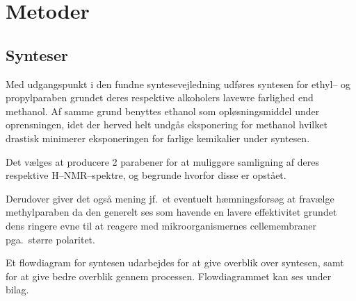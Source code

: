 \section{Metoder}
    \subsection{Synteser} 
    Med udgangspunkt i den fundne syntesevejledning \parencite{Ole2019} udføres syntesen for ethyl-- og propylparaben grundet deres respektive alkoholers lavewre farlighed end methanol. Af samme grund benyttes ethanol som opløsningsmiddel under oprensningen, idet der herved helt undgås eksponering for methanol hvilket drastisk minimerer eksponeringen for farlige kemikalier under syntesen.

    Det vælges at producere 2 parabener for at muliggøre samligning af deres respektive H--NMR--spektre, og begrunde hvorfor disse er opstået. 

    Derudover giver det også mening jf.\ et eventuelt hæmningsforsøg at fravælge methylparaben da den generelt ses som havende en lavere effektivitet grundet dens ringere evne til at reagere med mikroorganismernes cellemembraner pga.\ større polaritet.

    Et flowdiagram for syntesen udarbejdes for at give overblik over syntesen, samt for at give bedre overblik gennem processen. Flowdiagrammet kan ses under bilag.

